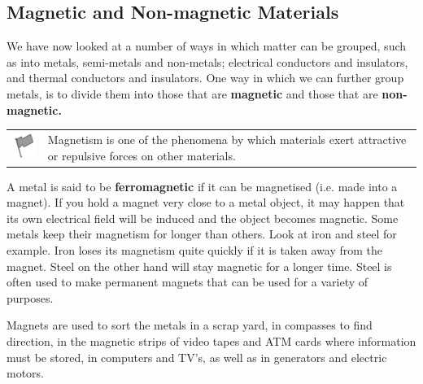             \subsection{ Magnetic and Non-magnetic Materials}
            \nopagebreak
      \label{m38706*id67151}We have now looked at a number of ways in which matter can be grouped, such as into metals, semi-metals and non-metals; electrical conductors and insulators, and thermal conductors and insulators. One way in which we can further group metals, is to divide them into those that are \textbf{magnetic} and those that are \textbf{non-magnetic.}\par 
\par
            \label{m38706*fhsst!!!underscore!!!id570}\begin{definition}
	  \begin{tabular*}{15 cm}{m{15 mm}m{}}
	\hspace*{-50pt}  \includegraphics[width=0.5in]{col11305.imgs/psflag2.png}   & \Definition{   \label{id2410309}\textbf{ Magnetism }} { \label{m38706*meaningfhsst!!!underscore!!!id570}
      \label{m38706*id67174}Magnetism is one of the phenomena by which materials exert attractive or repulsive forces on other materials. \par 
       } 
      \end{tabular*}
      \end{definition}
      \label{m38706*id67186}A metal is said to be \textbf{ferromagnetic} if it can be magnetised (i.e. made into a magnet). If you hold a magnet very close to a metal object, it may happen that its own electrical field will be induced and the object becomes magnetic. Some metals keep their magnetism for longer than others. Look at iron and steel for example. Iron loses its magnetism quite quickly if it is taken away from the magnet. Steel on the other hand will stay magnetic for a longer time. Steel is often used to make permanent magnets that can be used for a variety of purposes.\par 
      \label{m38706*id67200}Magnets are used to sort the metals in a scrap yard, in compasses to find direction, in the magnetic strips of video tapes and ATM cards where information must be stored, in computers and TV's, as well as in generators and electric motors.\par 
\label{m38706*secfhsst!!!underscore!!!id575}
